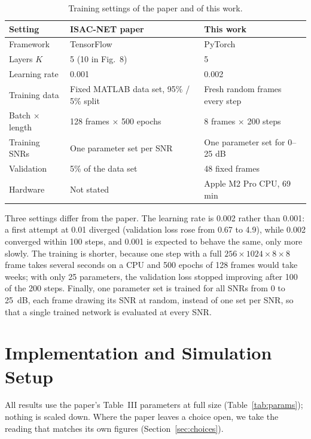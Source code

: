 \documentclass[11pt,a4paper]{article}
\begin{document}
\begin{table}[H]
\centering\small
\begin{tabular}{lll}
\toprule
Setting & ISAC-NET paper~\cite[Sec.~IV-B]{isacnet} & This work \\
\midrule
Framework & TensorFlow & PyTorch \\
Layers $K$ & 5 (10 in Fig.~8) & 5 \\
Learning rate & 0.001 & 0.002 \\
Training data & Fixed MATLAB data set, 95\% / 5\% split & Fresh random frames every step \\
Batch $\times$ length & 128 frames $\times$ 500 epochs & 8 frames $\times$ 200 steps \\
Training SNRs & One parameter set per SNR & One parameter set for 0--25 dB \\
Validation & 5\% of the data set & 48 fixed frames \\
Hardware & Not stated & Apple M2 Pro CPU, 69 min \\
\bottomrule
\end{tabular}
\caption{Training settings of the paper and of this work.}
\label{tab:train}
\end{table}

Three settings differ from the paper. The learning rate is 0.002 rather than 0.001: a first attempt at 0.01 diverged (validation loss rose from 0.67 to 4.9), while 0.002 converged within 100 steps, and 0.001 is expected to behave the same, only more slowly. The training is shorter, because one step with a full $256\times1024\times8\times8$ frame takes several seconds on a CPU and 500 epochs of 128 frames would take weeks; with only 25 parameters, the validation loss stopped improving after 100 of the 200 steps. Finally, one parameter set is trained for all SNRs from 0 to 25~dB, each frame drawing its SNR at random, instead of one set per SNR, so that a single trained network is evaluated at every SNR.

\section{Implementation and Simulation Setup}\label{sec:impl}
All results use the paper's Table~III parameters at full size (Table~\ref{tab:params}); nothing is scaled down. Where the paper leaves a choice open, we take the reading that matches its own figures (Section~\ref{sec:choices}).
\end{document}
